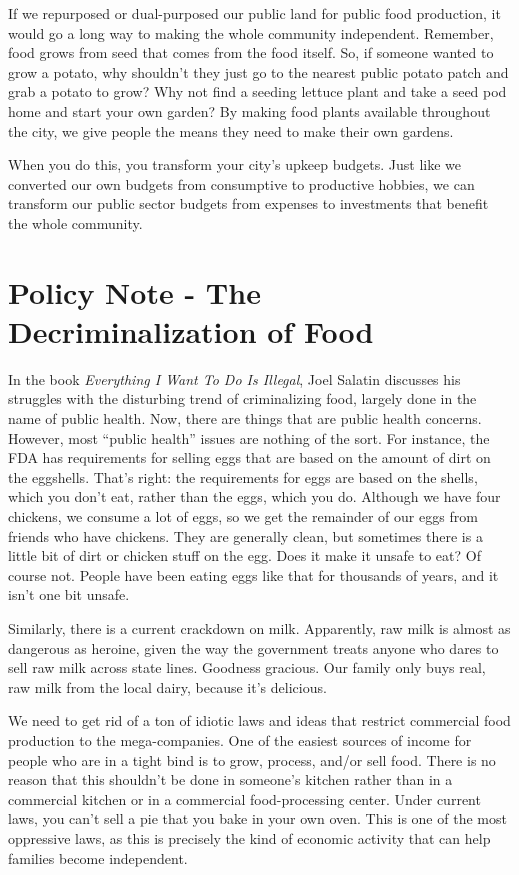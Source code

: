 If we repurposed or dual-purposed our public land for public food
production, it would go a long way to making the whole community
independent. Remember, food grows from seed that comes from the food
itself. So, if someone wanted to grow a potato, why shouldn’t they just
go to the nearest public potato patch and grab a potato to grow?  Why
not find a seeding lettuce plant and take a seed pod home and start
your own garden?  By making food plants available throughout the city,
we give people the means they need to make their own gardens.

When you do this, you transform your city’s upkeep budgets. Just like we
converted our own budgets from consumptive to productive hobbies, we
can transform our public sector budgets from expenses to investments
that benefit the whole community.

\section{Policy Note - The Decriminalization of Food}

In the book \textit{Everything I Want To Do Is Illegal}, Joel Salatin
discusses his struggles with the disturbing trend of criminalizing
food, largely done in the name of public health. Now, there are things
that are public health concerns. However, most “public health” issues
are nothing of the sort. For instance, the FDA has requirements for
selling eggs that are based on the amount of dirt on the eggshells.
That’s right: the requirements for eggs are based on the shells, which
you don’t eat, rather than the eggs, which you do. Although we have
four chickens, we consume a lot of eggs, so we get the remainder of our
eggs from friends who have chickens. They are generally clean, but
sometimes there is a little bit of dirt or chicken stuff on the egg.
Does it make it unsafe to eat?  Of course not. People have been eating
eggs like that for thousands of years, and it isn’t one bit unsafe.

Similarly, there is a current crackdown on milk. Apparently, raw milk is
almost as dangerous as heroine, given the way the government treats
anyone who dares to sell raw milk across state lines. Goodness
gracious. Our family only buys real, raw milk from the local dairy,
because it’s delicious.

We need to get rid of a ton of idiotic laws and ideas that restrict
commercial food production to the mega-companies. One of the easiest
sources of income for people who are in a tight bind is to grow,
process, and/or sell food. There is no reason that this shouldn’t be
done in someone’s kitchen rather than in a commercial kitchen or in a
commercial food-processing center. Under current laws, you can’t sell a
pie that you bake in your own oven. This is one of the most oppressive
laws, as this is precisely the kind of economic activity that can help
families become independent.

